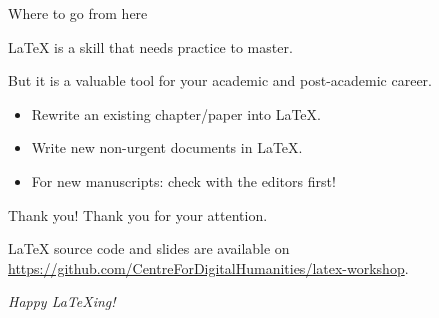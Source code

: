 \documentclass{beamer}
\begin{document}
\begin{frame}{Where to go from here}

    \LaTeX{} is a skill that needs practice to master.

    \medskip

    But it is a valuable tool for your academic and post-academic career.

    \medskip

    \begin{itemize}
        \item Rewrite an existing chapter/paper into \LaTeX.
        \item Write new non-urgent documents in \LaTeX.
        \item For new manuscripts: check with the editors first!
    \end{itemize}
\end{frame}

\begin{frame}{Thank you!}
    Thank you for your attention.

    \medskip

    \LaTeX{} source code and slides are available on \href{https://github.com/CentreForDigitalHumanities/latex-workshop}{https://github.com/CentreForDigitalHumanities/latex-workshop}.

    \medskip

    \begin{center}
        \textit{Happy \LaTeX{}ing!}
    \end{center}
\end{frame}
\end{document}
